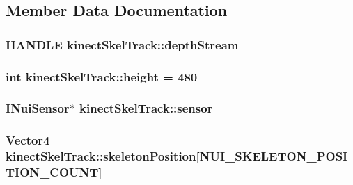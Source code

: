\subsection{Member Data Documentation}
\subsubsection[{\texorpdfstring{depth\+Stream}{depthStream}}]{\setlength{\rightskip}{0pt plus 5cm}H\+A\+N\+D\+LE kinect\+Skel\+Track\+::depth\+Stream}\hypertarget{classkinectSkelTrack_ac736221c582bd751c18af867bd1b90f1}{}\label{classkinectSkelTrack_ac736221c582bd751c18af867bd1b90f1}
\subsubsection[{\texorpdfstring{height}{height}}]{\setlength{\rightskip}{0pt plus 5cm}int kinect\+Skel\+Track\+::height = 480}\hypertarget{classkinectSkelTrack_a028f14282cd4301c8527703300d3dfe8}{}\label{classkinectSkelTrack_a028f14282cd4301c8527703300d3dfe8}
\subsubsection[{\texorpdfstring{sensor}{sensor}}]{\setlength{\rightskip}{0pt plus 5cm}I\+Nui\+Sensor$\ast$ kinect\+Skel\+Track\+::sensor}\hypertarget{classkinectSkelTrack_a56f6ca7277b34103919fb8a467f72820}{}\label{classkinectSkelTrack_a56f6ca7277b34103919fb8a467f72820}
\subsubsection[{\texorpdfstring{skeleton\+Position}{skeletonPosition}}]{\setlength{\rightskip}{0pt plus 5cm}Vector4 kinect\+Skel\+Track\+::skeleton\+Position\mbox{[}N\+U\+I\+\_\+\+S\+K\+E\+L\+E\+T\+O\+N\+\_\+\+P\+O\+S\+I\+T\+I\+O\+N\+\_\+\+C\+O\+U\+NT\mbox{]}}\hypertarget{classkinectSkelTrack_aaebb56f3ac894f41fe5c88334bfda4ed}{}\label{classkinectSkelTrack_aaebb56f3ac894f41fe5c88334bfda4ed}
